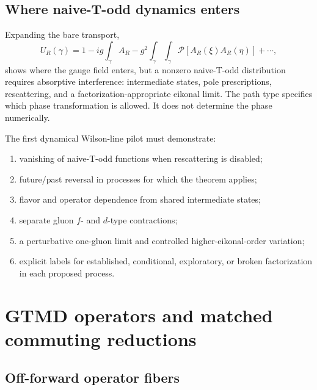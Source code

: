 \documentclass[11pt]{article}
\begin{document}
\subsection{Where naive-T-odd dynamics enters}

Expanding the bare transport,
\begin{equation}
 U_R(\gamma)=1-ig\int_\gamma A_R
 -g^2\int_{\gamma}\!\int_{\gamma}
 \mathcal P[A_R(\xi)A_R(\eta)]+\cdots,
\label{eq:holonomy-expansion}
\end{equation}
shows where the gauge field enters, but a nonzero naive-T-odd distribution
requires absorptive interference: intermediate states, pole prescriptions,
rescattering, and a factorization-appropriate eikonal limit.  The path type
specifies which phase transformation is allowed.  It does not determine the
phase numerically.

The first dynamical Wilson-line pilot must demonstrate:
\begin{enumerate}
\item vanishing of naive-T-odd functions when rescattering is disabled;
\item future/past reversal in processes for which the theorem applies;
\item flavor and operator dependence from shared intermediate states;
\item separate gluon \(f\)- and \(d\)-type contractions;
\item a perturbative one-gluon limit and controlled higher-eikonal-order
variation;
\item explicit labels for established, conditional, exploratory, or broken
factorization in each proposed process.
\end{enumerate}

\section{GTMD operators and matched commuting reductions}
\label{sec:gtmd-reductions}

\subsection{Off-forward operator fibers}
\end{document}
